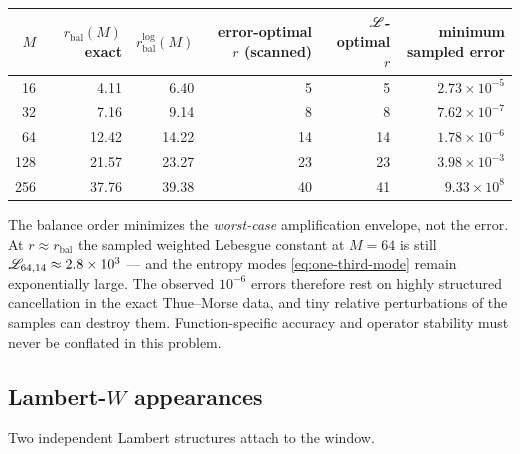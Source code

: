\begin{center}
\small
\begin{tabular}{rrrrrr}
\toprule
$M$ & $r_{\mathrm{bal}}(M)$ exact
 & $r^{\log}_{\mathrm{bal}}(M)$
 & error-optimal $r$ (scanned)
 & $\mathscr L$-optimal $r$
 & minimum sampled error \\
\midrule
16  & 4.11  & 6.40  & 5  & 5  & $2.73\times10^{-5}$ \\
32  & 7.16  & 9.14  & 8  & 8  & $7.62\times10^{-7}$ \\
64  & 12.42 & 14.22 & 14 & 14 & $1.78\times10^{-6}$ \\
128 & 21.57 & 23.27 & 23 & 23 & $3.98\times10^{-3}$ \\
256 & 37.76 & 39.38 & 40 & 41 & $9.33\times10^{8}$ \\
\bottomrule
\end{tabular}
\label{tab:balance}
\end{center}

\begin{warning}
The balance order minimizes the \emph{worst-case} amplification
envelope, not the error.  At $r\approx r_{\mathrm{bal}}$ the sampled
weighted Lebesgue constant at $M=64$ is still
$\mathscr L_{64,14}\approx2.8\times10^{3}$ --- and the entropy modes
\eqref{eq:one-third-mode} remain exponentially large.  The observed
$10^{-6}$ errors therefore rest on highly structured cancellation in
the exact Thue--Morse data, and tiny relative perturbations of the
samples can destroy them.  Function-specific accuracy and operator
stability must never be conflated in this problem.
\end{warning}

\subsection{Lambert-$W$ appearances}

Two independent Lambert structures attach to the window.

